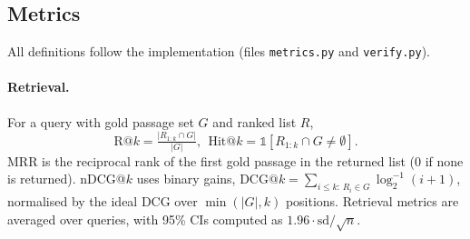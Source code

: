 \documentclass[11pt]{article}
\begin{document}
\begin{table}[t]
\centering\small
\setlength{\tabcolsep}{4pt}
\caption{Resources and counts, verified against the data files. Textbook chunks shorter than 50 characters are dropped before de-duplication. PubMedQA* is MIRAGE's question-only version of PubMedQA \citep{xiong2024benchmarking}.} %
\label{tab:resources}
\end{table}

\subsection{Metrics}\label{sec:metrics}
All definitions follow the implementation (files \texttt{metrics.py} and \texttt{verify.py}).

\paragraph{Retrieval.} For a query with gold passage set $G$ and ranked list $R$,
\begin{equation}
\mathrm{R@}k=\tfrac{|R_{1:k}\cap G|}{|G|},\ \ \mathrm{Hit@}k=\mathbb{1}[R_{1:k}\cap G\neq\emptyset].
\end{equation}
MRR is the reciprocal rank of the first gold passage in the returned list (0 if none is returned). nDCG@$k$ uses binary gains, $\mathrm{DCG@}k=\sum_{i\le k:\,R_i\in G} \log_2^{-1}(i{+}1)$, normalised by the ideal DCG over $\min(|G|,k)$ positions. Retrieval metrics are averaged over queries, with 95\% CIs computed as $1.96\cdot\mathrm{sd}/\sqrt{n}$.
\end{document}
